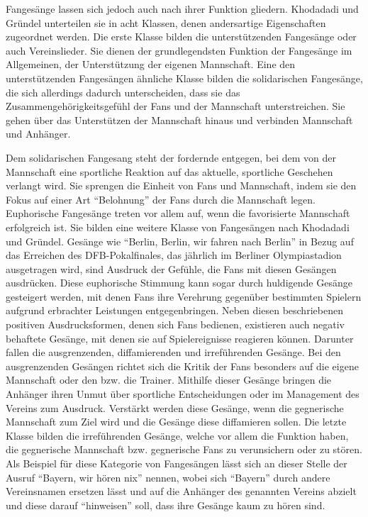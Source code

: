 Fangesänge lassen sich jedoch auch nach ihrer Funktion gliedern. Khodadadi und Gründel unterteilen sie in acht Klassen, denen andersartige Eigenschaften zugeordnet werden.
Die erste Klasse bilden die unterstützenden Fangesänge oder auch Vereinslieder.
Sie dienen der grundlegendsten Funktion der Fangesänge im Allgemeinen, der Unterstützung der eigenen Mannschaft.
Eine den unterstützenden Fangesängen ähnliche Klasse bilden die solidarischen Fangesänge, die sich allerdings dadurch unterscheiden, dass sie das Zusammengehörigkeitsgefühl der Fans und der Mannschaft unterstreichen.
Sie gehen über das Unterstützen der Mannschaft hinaus und verbinden Mannschaft und Anhänger.

Dem solidarischen Fangesang steht der fordernde entgegen, bei dem von der Mannschaft eine sportliche Reaktion auf das aktuelle, sportliche Geschehen verlangt wird.
Sie sprengen die Einheit von Fans und Mannschaft, indem sie den Fokus auf einer Art "`Belohnung"' der Fans durch die Mannschaft legen.
Euphorische Fangesänge treten vor allem auf, wenn die favorisierte Mannschaft erfolgreich ist.
Sie bilden eine weitere Klasse von Fangesängen nach Khodadadi und Gründel.
Gesänge wie "`Berlin, Berlin, wir fahren nach Berlin"' in Bezug auf das Erreichen des DFB-Pokalfinales, das jährlich im Berliner Olympiastadion ausgetragen wird, sind Ausdruck der Gefühle, die Fans mit diesen Gesängen ausdrücken.
Diese euphorische Stimmung kann sogar durch huldigende Gesänge gesteigert werden, mit denen Fans ihre Verehrung gegenüber bestimmten Spielern aufgrund erbrachter Leistungen entgegenbringen.
Neben diesen beschriebenen positiven Ausdrucksformen, denen sich Fans bedienen, existieren auch negativ behaftete Gesänge, mit denen sie auf Spielereignisse reagieren können.
Darunter fallen die ausgrenzenden, diffamierenden und irreführenden Gesänge.
Bei den ausgrenzenden Gesängen richtet sich die Kritik der Fans besonders auf die eigene Mannschaft oder den bzw. die Trainer.
Mithilfe dieser Gesänge bringen die Anhänger ihren Unmut über sportliche Entscheidungen oder im Management des Vereins zum Ausdruck.
Verstärkt werden diese Gesänge, wenn die gegnerische Mannschaft zum Ziel wird und die Gesänge diese diffamieren sollen.
Die letzte Klasse bilden die irreführenden Gesänge, welche vor allem die Funktion haben, die gegnerische Mannschaft bzw. gegnerische Fans zu verunsichern oder zu stören.
Als Beispiel für diese Kategorie von Fangesängen lässt sich an dieser Stelle der Ausruf "`Bayern, wir hören nix"' nennen, wobei sich "`Bayern"' durch andere Vereinsnamen ersetzen lässt und auf die Anhänger des genannten Vereins abzielt und diese darauf "`hinweisen"' soll, dass ihre Gesänge kaum zu hören sind.

